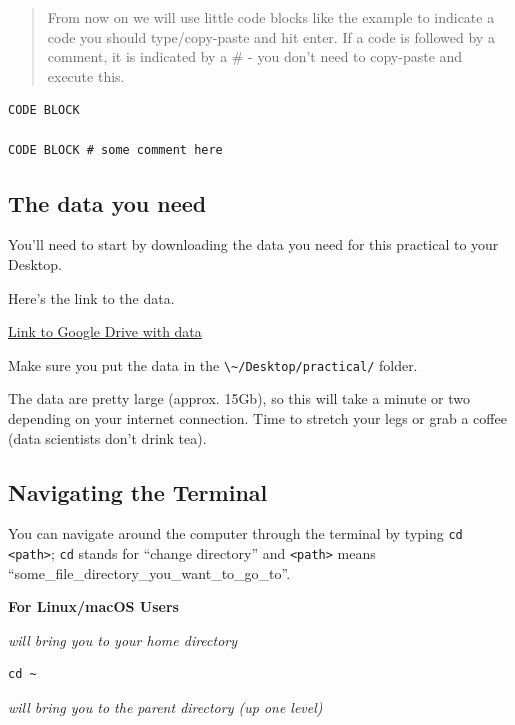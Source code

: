 \documentclass[
]{book}
\newcommand{\passthrough}[1]{#1}
\begin{document}
\begin{quote}
From now on we will use little code blocks like the example to indicate a code you should type/copy-paste and hit enter. If a code is followed by a comment, it is indicated by a \# - you don't need to copy-paste and execute this.
\end{quote}

\begin{lstlisting}
CODE BLOCK

CODE BLOCK # some comment here
\end{lstlisting}

\hypertarget{the-data-you-need}{%
\subsection{The data you need}\label{the-data-you-need}}

You'll need to start by downloading the data you need for this practical to your Desktop.

Here's the link to the data.

\href{https://drive.google.com/drive/folders/1iDLB1y534DfgEZNPCYBrIj5X7g_XlBba?usp=share_link}{Link to Google Drive with data}

Make sure you put the data in the \passthrough{\lstinline!\~/Desktop/practical/!} folder.

The data are pretty large (approx. 15Gb), so this will take a minute or two depending on your internet connection. Time to stretch your legs or grab a coffee (data scientists don't drink tea).

\hypertarget{navigating-the-terminal}{%
\subsection{Navigating the Terminal}\label{navigating-the-terminal}}

You can navigate around the computer through the terminal by typing \passthrough{\lstinline!cd <path>!}; \passthrough{\lstinline!cd!} stands for ``change directory'' and \passthrough{\lstinline!<path>!} means ``some\_file\_directory\_you\_want\_to\_go\_to''.

\textbf{For Linux/macOS Users}

\emph{will bring you to your home directory}

\begin{lstlisting}
cd ~ 
\end{lstlisting}

\emph{will bring you to the parent directory (up one level) }
\end{document}
